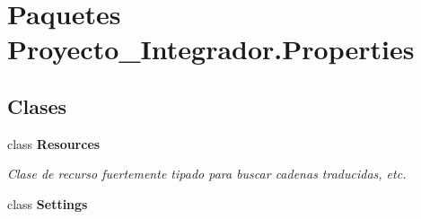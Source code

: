 \section{Paquetes Proyecto\-\_\-\-Integrador.\-Properties}
\label{namespace_proyecto___integrador_1_1_properties}
\subsection*{Clases}
\begin{DoxyCompactItemize}
\item 
class {\bf Resources}
\begin{DoxyCompactList}\small\item\em Clase de recurso fuertemente tipado para buscar cadenas traducidas, etc. \end{DoxyCompactList}\item 
class {\bf Settings}
\end{DoxyCompactItemize}
